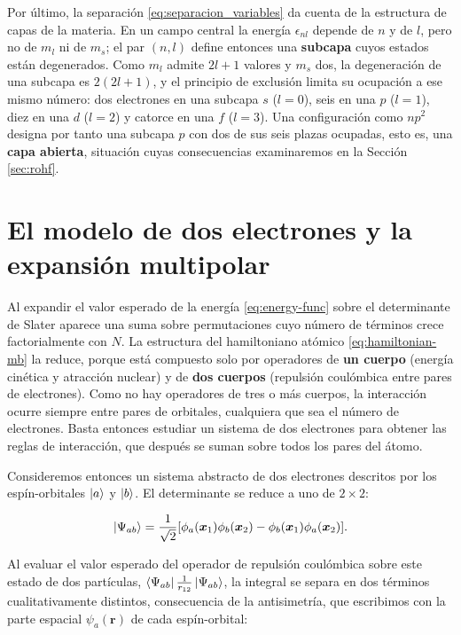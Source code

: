 Por último, la separación \eqref{eq:separacion_variables} da cuenta de la estructura de capas de la materia. En un campo central la energía $\epsilon_{nl}$ depende de $n$ y de $l$, pero no de $m_l$ ni de $m_s$; el par $(n,l)$ define entonces una \textbf{subcapa} cuyos estados están degenerados. Como $m_l$ admite $2l+1$ valores y $m_s$ dos, la degeneración de una subcapa es $2(2l+1)$, y el principio de exclusión limita su ocupación a ese mismo número: dos electrones en una subcapa $s$ ($l=0$), seis en una $p$ ($l=1$), diez en una $d$ ($l=2$) y catorce en una $f$ ($l=3$). Una configuración como $np^2$ designa por tanto una subcapa $p$ con dos de sus seis plazas ocupadas, esto es, una \textbf{capa abierta}, situación cuyas consecuencias examinaremos en la Sección \ref{sec:rohf}.

\section{El modelo de dos electrones y la expansión multipolar}
\label{sec:dos_electrones_multipolar}
\label{sec:slater_integrals}

Al expandir el valor esperado de la energía \eqref{eq:energy-func} sobre el determinante de Slater aparece una suma sobre permutaciones cuyo número de términos crece factorialmente con $N$. La estructura del hamiltoniano atómico \eqref{eq:hamiltonian-mb} la reduce, porque está compuesto solo por operadores de \textbf{un cuerpo} (energía cinética y atracción nuclear) y de \textbf{dos cuerpos} (repulsión coulómbica entre pares de electrones). Como no hay operadores de tres o más cuerpos, la interacción ocurre siempre entre pares de orbitales, cualquiera que sea el número de electrones. Basta entonces estudiar un sistema de dos electrones para obtener las reglas de interacción, que después se suman sobre todos los pares del átomo.

Consideremos entonces un sistema abstracto de dos electrones descritos por los espín-orbitales \( \ket{a} \) y \( \ket{b} \). El determinante se reduce a uno de $2 \times 2$:

\begin{equation}
  \ket{\Psi_{ab}} = \frac{1}{\sqrt{2}} [\phi_a(\bm{x}_1)\phi_b(\bm{x}_2) - \phi_b(\bm{x}_1)\phi_a(\bm{x}_2)].
\end{equation}

Al evaluar el valor esperado del operador de repulsión coulómbica sobre este estado de dos partículas, $\bra{\Psi_{ab}} \frac{1}{r_{12}} \ket{\Psi_{ab}}$, la integral se separa en dos términos cualitativamente distintos, consecuencia de la antisimetría, que escribimos con la parte espacial $\psi_a(\bm{r})$ de cada espín-orbital:

